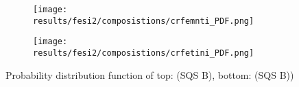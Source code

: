 \begin{figure}[H]
	\centering
	\begin{subfigure}{\textwidth}
		\texttt{[image: results/fesi2/composistions/crfemnti\_PDF.png]}
	\end{subfigure}
	\begin{subfigure}{\textwidth}
		\texttt{[image: results/fesi2/composistions/crfetini\_PDF.png]}
	\end{subfigure}
	\caption{Probability distribution function of top:  (SQS B), bottom:  (SQS B))}
\end{figure}